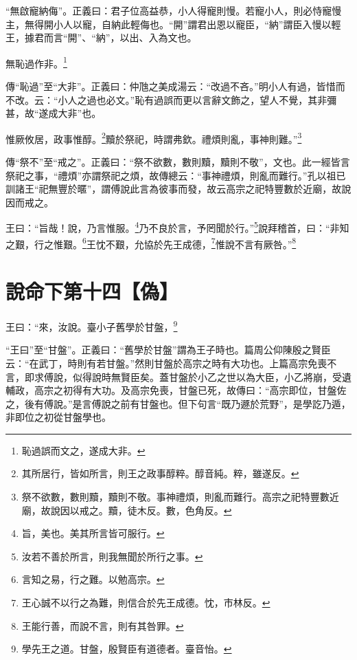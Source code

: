 {\noindent\shu{}\fzkt “無啟寵納侮”。正義曰：君子位高益恭，小人得寵則慢。若寵小人，則必恃寵慢主，無得開小人以寵，自納此輕侮也。“開”謂君出恩以寵臣，“納”謂臣入慢以輕王，據君而言“開”、“納”，以出、入為文也。 \par}

無恥過作非。\footnote{恥過誤而文之，遂成大非。}

{\noindent\zhuan{}\fzbyks 傳“恥過”至“大非”。正義曰：仲虺之美成湯云：“改過不吝。”明小人有過，皆惜而不改。云：“小人之過也必文。”恥有過誤而更以言辭文飾之，望人不覺，其非彌甚，故“遂成大非”也。 \par}

惟厥攸居，政事惟醇。\footnote{其所居行，皆如所言，則王之政事醇粹。醇音純。粹，雖遂反。}黷於祭祀，時謂弗欽。禮煩則亂，事神則難。”\footnote{祭不欲數，數則黷，黷則不敬。事神禮煩，則亂而難行。高宗之祀特豐數近廟，故說因以戒之。黷，徒木反。數，色角反。}

{\noindent\zhuan{}\fzbyks 傳“祭不”至“戒之”。正義曰：“祭不欲數，數則黷，黷則不敬”，文也。此一經皆言祭祀之事，“禮煩”亦謂祭祀之煩，故傳總云：“事神禮煩，則亂而難行。”孔以祖已訓諸王“祀無豐於暱”，謂傅說此言為彼事而發，故云高宗之祀特豐數於近廟，故說因而戒之。 \par}

王曰：“旨哉！說，乃言惟服。\footnote{旨，美也。美其所言皆可服行。}乃不良於言，予罔聞於行。”\footnote{汝若不善於所言，則我無聞於所行之事。}說拜稽首，曰：“非知之艱，行之惟艱。\footnote{言知之易，行之難。以勉高宗。}王忱不艱，允協於先王成德，\footnote{王心誠不以行之為難，則信合於先王成德。忱，市林反。}惟說不言有厥咎。”\footnote{王能行善，而說不言，則有其咎罪。}

\section{說命下第十四【偽】}

王曰：“來，汝說。臺小子舊學於甘盤，\footnote{學先王之道。甘盤，殷賢臣有道德者。臺音怡。}

{\noindent\shu{}\fzkt “王曰”至“甘盤”。正義曰：“舊學於甘盤”謂為王子時也。篇周公仰陳殷之賢臣云：“在武丁，時則有若甘盤。”然則甘盤於高宗之時有大功也。上篇高宗免喪不言，即求傅說，似得說時無賢臣矣。蓋甘盤於小乙之世以為大臣，小乙將崩，受遺輔政，高宗之初得有大功。及高宗免喪，甘盤已死，故傳曰：“高宗即位，甘盤佐之，後有傅說。”是言傅說之前有甘盤也。但下句言“既乃遯於荒野”，是學訖乃遁，非即位之初從甘盤學也。 \par}

